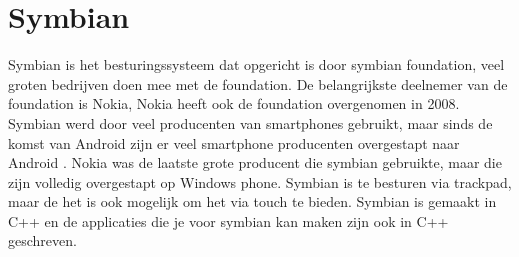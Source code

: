 \section{Symbian}

Symbian is het besturingssysteem dat opgericht is door symbian foundation,  veel groten bedrijven doen mee met de foundation. De belangrijkste deelnemer van de foundation is Nokia, Nokia heeft ook de foundation overgenomen in 2008. Symbian werd door veel producenten van smartphones gebruikt, maar sinds de komst van Android zijn er veel smartphone producenten overgestapt naar Android \citep{nieuwemobiel}. Nokia was de laatste grote producent die symbian gebruikte, maar die zijn volledig overgestapt op Windows phone. Symbian is te besturen via trackpad, maar de het is ook mogelijk om het via touch te bieden. Symbian is gemaakt in C++ en de applicaties die je voor symbian kan maken zijn ook in C++ geschreven.

